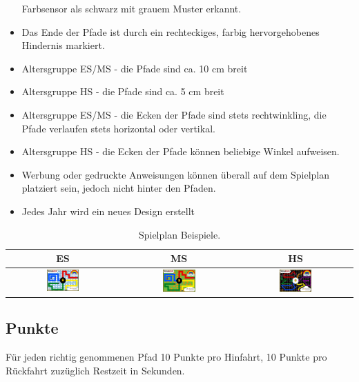\documentclass[a4paper,12pt]{article}
\begin{document}
\begin{itemize}
		Farbsensor als schwarz mit grauem Muster erkannt.
	\item Das Ende der Pfade ist durch ein rechteckiges, farbig
		hervorgehobenes Hindernis markiert.
	\item Altersgruppe ES/MS - die Pfade sind ca. 10 cm breit
	\item Altersgruppe HS - die Pfade sind ca. 5 cm breit
	\item Altersgruppe ES/MS - die Ecken der Pfade sind stets
		rechtwinkling, die Pfade verlaufen stets horizontal oder
		vertikal.
	\item Altersgruppe HS - die Ecken der Pfade können beliebige Winkel
		aufweisen.
	\item Werbung oder gedruckte Anweisungen können überall auf dem
		Spielplan platziert sein, jedoch nicht hinter den Pfaden.
	\item Jedes Jahr wird ein neues Design erstellt
\end{itemize}

\begin{center}
\begin{table}
	\begin{tabular}{|c|c|c|} \hline
		ES & MS & HS \\
		\hline
\includegraphics[width=0.3\textwidth]{images/cyberspace/rainbow_es.png}
&
\includegraphics[width=0.3\textwidth]{images/cyberspace/rainbow_ms.png}
&
\includegraphics[width=0.3\textwidth]{images/cyberspace/rainbow_hs.png}
\\
    		\hline
	\end{tabular}
\caption{\label{tab:table-name}Spielplan Beispiele.}
\end{table}
\end{center}

\subsection{Punkte}

Für jeden richtig genommenen Pfad 10 Punkte pro Hinfahrt, 10 Punkte pro
Rückfahrt zuzüglich Restzeit in Sekunden.
\end{document}
